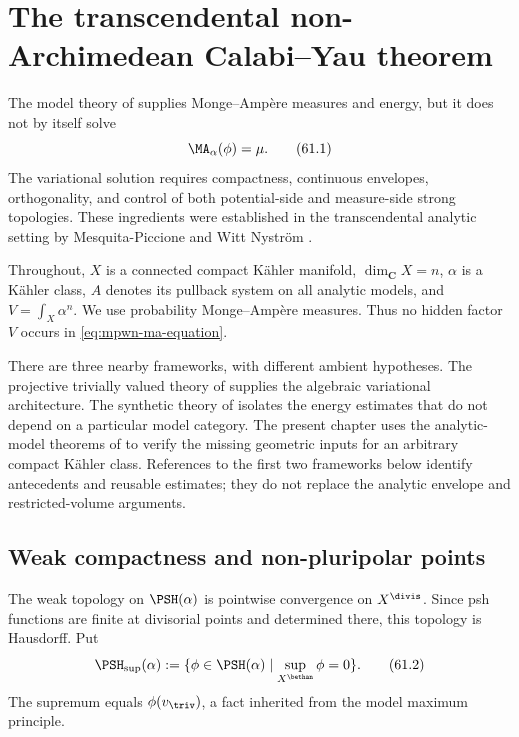 \chapter{The transcendental non-Archimedean Calabi--Yau theorem}
\label{chap:mpwn-cy}

The model theory of  supplies Monge--Amp\`ere measures and energy,
but it does not by itself solve
\[
                          \MA_\alpha(\phi)=\mu.
\tag{61.1}\label{eq:mpwn-ma-equation}
\]
The variational solution requires compactness, continuous envelopes,
orthogonality, and control of both potential-side and measure-side strong
topologies.  These ingredients were established in the transcendental
analytic setting by Mesquita-Piccione and Witt Nystr\"om
\cite{MPWN25}.

Throughout, $X$ is a connected compact K\"ahler manifold, $\dim_{\mathbf C}X=n$,
$\alpha$ is a K\"ahler class, $A$ denotes its pullback system on all
analytic models, and $V=\int_X\alpha^n$.  We use probability
Monge--Amp\`ere measures.  Thus no hidden factor $V$ occurs in
\eqref{eq:mpwn-ma-equation}.

There are three nearby frameworks, with different ambient hypotheses.  The
projective trivially valued theory of \cite{BJ22} supplies the algebraic
variational architecture.  The synthetic theory of
\cite{BJ25FiniteEnergy} isolates the energy estimates that do not depend on
a particular model category.  The present chapter uses the analytic-model
theorems of \cite{MPWN25} to verify the missing geometric inputs for an
arbitrary compact K\"ahler class.  References to the first two frameworks
below identify antecedents and reusable estimates; they do not replace the
analytic envelope and restricted-volume arguments.

\section{Weak compactness and non-pluripolar points}
\label{sec:mpwn-weak-compactness}

The weak topology on $\PSH(\alpha)$ is pointwise convergence on
$X^{\divis}$.  Since psh functions are finite at divisorial points and
determined there, this topology is Hausdorff.  Put
\[
 \PSH_{\sup}(\alpha)
 :=\{\phi\in\PSH(\alpha)\mid\sup_{X^{\bethan}}\phi=0\}.
\tag{61.2}\label{eq:mpwn-sup-normalized-psh}
\]
The supremum equals $\phi(v_{\triv})$, a fact inherited from the model
maximum principle.

